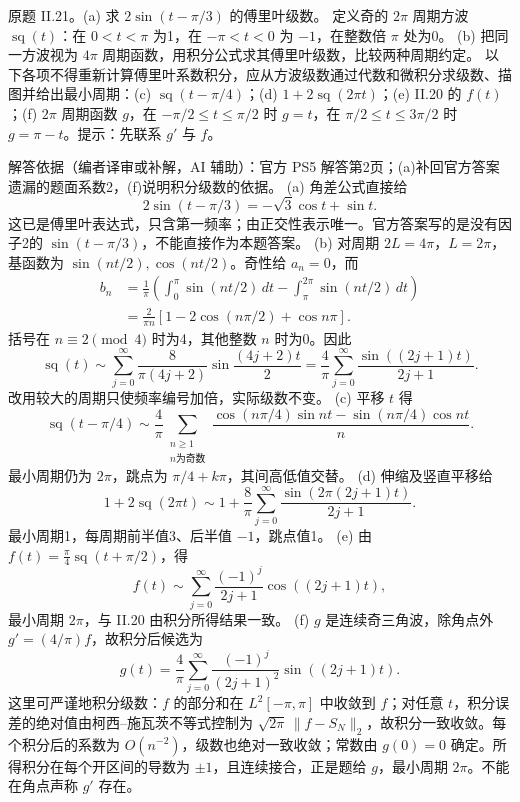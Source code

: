 \begin{exercise}\label{cw:ps5-II-21}
原题 II.21。(a) 求 $2\sin(t-\pi/3)$ 的傅里叶级数。
定义奇的 $2\pi$ 周期方波 $\operatorname{sq}(t)$：在 $0<t<\pi$ 为1，在 $-\pi<t<0$ 为 $-1$，在整数倍 $\pi$ 处为0。
(b) 把同一方波视为 $4\pi$ 周期函数，用积分公式求其傅里叶级数，比较两种周期约定。
以下各项不得重新计算傅里叶系数积分，应从方波级数通过代数和微积分求级数、描图并给出最小周期：(c) $\operatorname{sq}(t-\pi/4)$；(d) $1+2\operatorname{sq}(2\pi t)$；(e) II.20 的 $f(t)$；(f) $2\pi$ 周期函数 $g$，在 $-\pi/2\leq t\leq\pi/2$ 时 $g=t$，在 $\pi/2\leq t\leq3\pi/2$ 时 $g=\pi-t$。提示：先联系 $g'$ 与 $f$。
\end{exercise}
\begin{solution}
解答依据（编者译审或补解，AI 辅助）：官方 PS5 解答第2页；(a)补回官方答案遗漏的题面系数2，(f)说明积分级数的依据。
(a) 角差公式直接给
\[
 2\sin(t-\pi/3)=-\sqrt3\cos t+\sin t.
\]
这已是傅里叶表达式，只含第一频率；由正交性表示唯一。官方答案写的是没有因子2的 $\sin(t-\pi/3)$，不能直接作为本题答案。
(b) 对周期 $2L=4\pi$，$L=2\pi$，基函数为 $\sin(nt/2),\cos(nt/2)$。奇性给 $a_n=0$，而
\begin{align*}
 b_n&=\frac1\pi\left(\int_0^\pi\sin(nt/2)\,dt-\int_\pi^{2\pi}\sin(nt/2)\,dt\right)\\
 &=\frac2{\pi n}\left[1-2\cos(n\pi/2)+\cos n\pi\right].
\end{align*}
括号在 $n\equiv2\pmod4$ 时为4，其他整数 $n$ 时为0。因此
\[
 \operatorname{sq}(t)\sim\sum_{j=0}^\infty\frac8{\pi(4j+2)}\sin\frac{(4j+2)t}{2}
 =\frac4\pi\sum_{j=0}^\infty\frac{\sin((2j+1)t)}{2j+1}.
\]
改用较大的周期只使频率编号加倍，实际级数不变。
(c) 平移 $t$ 得
\[
 \operatorname{sq}(t-\pi/4)\sim\frac4\pi\sum_{\substack{n\geq1\\n\text{为奇数}}}
 \frac{\cos(n\pi/4)\sin nt-\sin(n\pi/4)\cos nt}{n}.
\]
最小周期仍为 $2\pi$，跳点为 $\pi/4+k\pi$，其间高低值交替。
(d) 伸缩及竖直平移给
\[
 1+2\operatorname{sq}(2\pi t)\sim1+\frac8\pi\sum_{j=0}^\infty
 \frac{\sin(2\pi(2j+1)t)}{2j+1}.
\]
最小周期1，每周期前半值3、后半值 $-1$，跳点值1。
(e) 由 $f(t)=\frac\pi4\operatorname{sq}(t+\pi/2)$，得
\[
 f(t)\sim\sum_{j=0}^\infty\frac{(-1)^j}{2j+1}\cos((2j+1)t),
\]
最小周期 $2\pi$，与 II.20 由积分所得结果一致。
(f) $g$ 是连续奇三角波，除角点外 $g'=(4/\pi)f$，故积分后候选为
\[
 g(t)=\frac4\pi\sum_{j=0}^\infty\frac{(-1)^j}{(2j+1)^2}\sin((2j+1)t).
\]
这里可严谨地积分级数：$f$ 的部分和在 $L^2[-\pi,\pi]$ 中收敛到 $f$；对任意 $t$，积分误差的绝对值由柯西--施瓦茨不等式控制为 $\sqrt{2\pi}\,\|f-S_N\|_2$，故积分一致收敛。每个积分后的系数为 $O(n^{-2})$，级数也绝对一致收敛；常数由 $g(0)=0$ 确定。所得积分在每个开区间的导数为 $\pm1$，且连续接合，正是题给 $g$，最小周期 $2\pi$。不能在角点声称 $g'$ 存在。


\end{solution}
